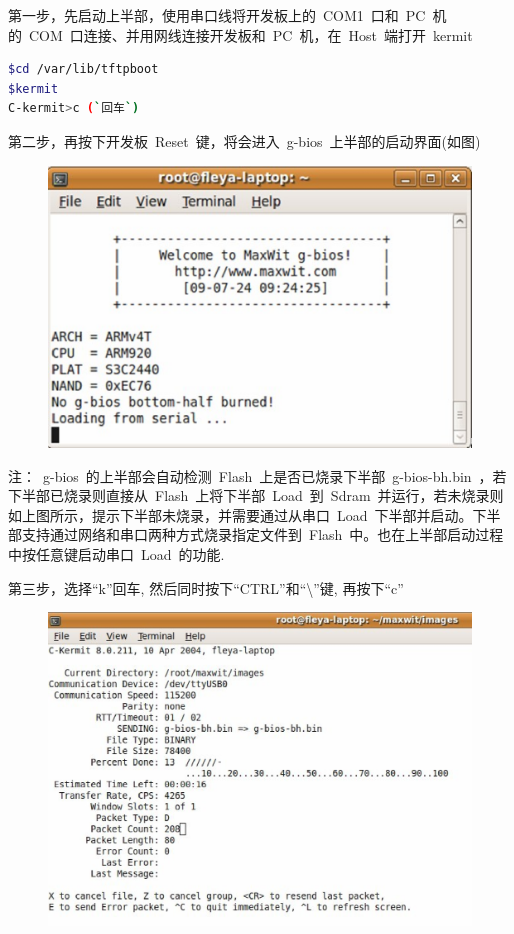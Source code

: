 \documentclass[a4paper,11pt]{book}
\begin{document}
\noindent 第一步，先启动上半部，使用串口线将开发板上的~COM1~口和~PC~机的~COM~口连接、并用网线连接开发板和~PC~机，在~Host~端打开~kermit~\\
\begin{lstlisting}[language=bash,escapeinside=``]
$cd /var/lib/tftpboot
$kermit
C-kermit>c (`回车`)
\end{lstlisting}
\noindent 第二步，再按下开发板~Reset~键，将会进入~g-bios~上半部的启动界面(如图)\\

\begin{figure}[t]
\centering
\includegraphics[width=5in]{image/step2.eps}
\end{figure}

\noindent 注：~g-bios~的上半部会自动检测~Flash~上是否已烧录下半部~g-bios-bh.bin~，若下半部已烧录则直接从~Flash~上将下半部~Load~到~Sdram~并运行，若未烧录则如上图所示，提示下半部未烧录，并需要通过从串口~Load~下半部并启动。下半部支持通过网络和串口两种方式烧录指定文件到~Flash~中。也在上半部启动过程中按任意键启动串口~Load~的功能.

\noindent 第三步，选择``k''回车, 然后同时按下``CTRL''和``\textbackslash''键, 再按下``c''\\

\begin{figure}[H]
\centering
\includegraphics[width=5in]{image/step3.eps}
\end{figure}
\end{document}
